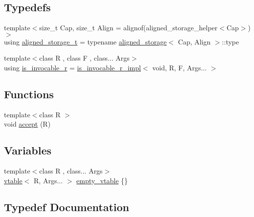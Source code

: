 \subsection*{Typedefs}
\begin{DoxyCompactItemize}
\item 
{\footnotesize template$<$size\+\_\+t Cap, size\+\_\+t Align = alignof(aligned\+\_\+storage\+\_\+helper$<$\+Cap$>$)$>$ }\\using \hyperlink{namespacestdext_1_1inplace__function__detail_a84aa129d717eea675489c4b491812944}{aligned\+\_\+storage\+\_\+t} = typename \hyperlink{structstdext_1_1inplace__function__detail_1_1aligned__storage}{aligned\+\_\+storage}$<$ Cap, Align $>$\+::type
\item 
{\footnotesize template$<$class R , class F , class... Args$>$ }\\using \hyperlink{namespacestdext_1_1inplace__function__detail_a8d53be19103030d83354d280975ae690}{is\+\_\+invocable\+\_\+r} = \hyperlink{structstdext_1_1inplace__function__detail_1_1is__invocable__r__impl}{is\+\_\+invocable\+\_\+r\+\_\+impl}$<$ void, R, F, Args... $>$
\end{DoxyCompactItemize}
\subsection*{Functions}
\begin{DoxyCompactItemize}
\item 
{\footnotesize template$<$class R $>$ }\\void \hyperlink{namespacestdext_1_1inplace__function__detail_a6ea79bf8d7a67334837baa7bafb73bf1}{accept} (R)
\end{DoxyCompactItemize}
\subsection*{Variables}
\begin{DoxyCompactItemize}
\item 
{\footnotesize template$<$class R , class... Args$>$ }\\\hyperlink{structstdext_1_1inplace__function__detail_1_1vtable}{vtable}$<$ R, Args... $>$ \hyperlink{namespacestdext_1_1inplace__function__detail_a31403f05f455c45323900ed791032eda}{empty\+\_\+vtable} \{\}
\end{DoxyCompactItemize}


\subsection{Typedef Documentation}
\mbox{\label{namespacestdext_1_1inplace__function__detail_a84aa129d717eea675489c4b491812944}} 
